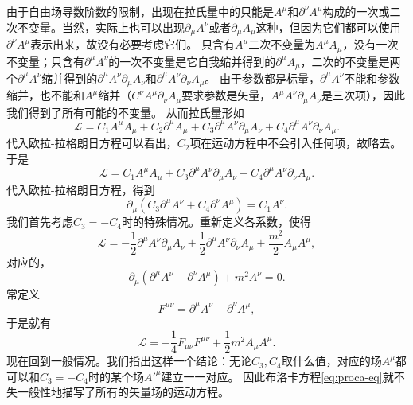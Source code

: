 \documentclass[hyperref, UTF8, a4paper]{ctexart}
\begin{document}
由于自由场导数阶数的限制，出现在拉氏量中的只能是$A^\mu$和$\partial^\nu A^\mu$构成的一次或二次不变量。当然，实际上也可以出现$\partial_\mu A^\nu$或者$\partial_\mu A_\mu$这种，但因为它们都可以使用$\partial^\nu A^\mu$表示出来，故没有必要考虑它们。
只含有$A^\mu$二次不变量为$A^\mu A_\mu$，没有一次不变量；只含有$\partial^\mu A^\nu$的一次不变量是它自我缩并得到的$\partial^\mu A_\mu$，二次的不变量是两个$\partial^\mu A^\nu$缩并得到的$\partial^\mu A^\nu \partial_\mu A_\nu$和$\partial^\mu A^\nu \partial_\nu A_\mu$。
由于参数都是标量，$\partial^\mu A^\nu$不能和参数缩并，也不能和$A^\mu$缩并（$C^\nu A^\mu \partial_\nu A_\mu$要求参数是矢量，$A^\mu A^\nu \partial_\mu A_\nu$是三次项），因此我们得到了所有可能的不变量。
从而拉氏量形如
\[
    \mathcal{L} = C_1 A^\mu A_\mu + C_2 \partial^\mu A_\mu + C_3 \partial^\mu A^\nu \partial_\mu A_\nu + C_4 \partial^\mu A^\nu \partial_\nu A_\mu.
\]
代入欧拉-拉格朗日方程可以看出，$C_2$项在运动方程中不会引入任何项，故略去。
于是
\[
    \mathcal{L} = C_1 A^\mu A_\mu + C_3 \partial^\mu A^\nu \partial_\mu A_\nu + C_4 \partial^\mu A^\nu \partial_\nu A_\mu.
\]
代入欧拉-拉格朗日方程，得到
\begin{equation}
    \partial_\mu (C_3 \partial^\mu A^\nu +  C_4 \partial^\nu A^\mu) = C_1 A^\nu.
    \label{eq:vector-motion-eq}
\end{equation}
我们首先考虑$C_3 = - C_4$时的特殊情况。重新定义各系数，使得
\begin{equation}
    \mathcal{L} = - \frac{1}{2} \partial^\mu A^\nu \partial_\mu A_\nu + \frac{1}{2} \partial^\mu A^\nu \partial_\nu A_\mu + \frac{m^2}{2} A_\mu A^\mu,
\end{equation}
对应的，
\begin{equation}
    \partial_\mu (\partial^\mu A^\nu - \partial^\nu A^\mu) + m^2 A^\nu = 0.
    \label{eq:proca-eq}
\end{equation}
常定义
\begin{equation}
    F^{\mu \nu} = \partial^\mu A^\nu - \partial^\nu A^\mu,
\end{equation}
于是就有
\begin{equation}
    \mathcal{L} = - \frac{1}{4} F_{\mu \nu} F^{\mu \nu} + \frac{1}{2} m^2 A_\mu A^\mu.
    \label{eq:proca-lagrangian}
\end{equation}
现在回到一般情况。我们指出这样一个结论：无论$C_3,C_4$取什么值，对应的场$A^\mu$都可以和$C_3 = - C_4$时的某个场${A'}^\mu$建立一一对应。
因此布洛卡方程\eqref{eq:proca-eq}就不失一般性地描写了所有的矢量场的运动方程。
\end{document}
